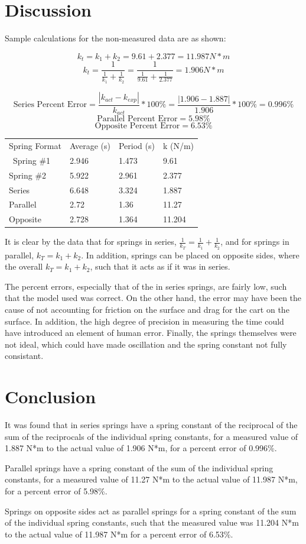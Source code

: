 \documentclass[11pt, titlepage]{article}
\begin{document}
\section*{Discussion}
Sample calculations for the non-measured data are as shown:

$$k_t = k_1 + k_2 = 9.61 + 2.377 = 11.987 N*m$$
$$k_t = \frac{1}{\frac{1}{k_1} + \frac{1}{k_2}} = \frac{1}{\frac{1}{9.61} + \frac{1}{2.377}} = 1.906 N*m$$

$$\text{Series Percent Error} = \frac{|k_{act} - k_{exp}|}{k_{act}} * 100\% = \frac{|1.906 - 1.887|}{1.906} * 100\% = 0.996\% $$ 
$$\text{Parallel Percent Error} = 5.98\% $$
$$\text{Opposite Percent Error} = 6.53\% $$

\begin{center}
\begin{tabular}
{|m{8em}|m{8em}|m{8em}|m{8em}|}
Spring Format & Average (s) & Period (s) & k (N/m) \\\
Spring \#1 & 2.946 & 1.473 & 9.61 \\
Spring \#2 & 5.922 & 2.961 & 2.377 \\
Series & 6.648 & 3.324 & 1.887 \\
Parallel & 2.72 & 1.36 & 11.27 \\
Opposite & 2.728 & 1.364 & 11.204 \\
\end{tabular}
\end{center}

It is clear by the data that for springs in series, $\frac{1}{k_T} = \frac{1}{k_1} + \frac{1}{k_2}$, and for springs in parallel, $k_T = k_1 + k_2$. In addition, springs can be placed on opposite sides, where the overall $k_T = k_1 + k_2$, such that it acts as if it was in series.

The percent errors, especially that of the in series springs, are fairly low, such that the model used was correct. On the other hand, the error may have been the cause of not accounting for friction on the surface and drag for the cart on the surface. In addition, the high degree of precision in measuring the time could have introduced an element of human error. Finally, the springs themselves were not ideal, which could have made oscillation and the spring constant not fully consistant.

\section*{Conclusion}
It was found that in series springs have a spring constant of the reciprocal of the sum of the reciprocals of the individual spring constants, for a measured value of 1.887 N*m to the actual value of 1.906 N*m, for a percent error of 0.996\%.

Parallel springs have a spring constant of the sum of the individual spring constants, for a measured value of 11.27 N*m to the actual value of 11.987 N*m, for a percent error of 5.98\%.

Springs on opposite sides act as parallel springs for a spring constant of the sum of the individual spring constants, such that the measured value was 11.204 N*m to the actual value of 11.987 N*m for a percent error of 6.53\%.
\end{document}
